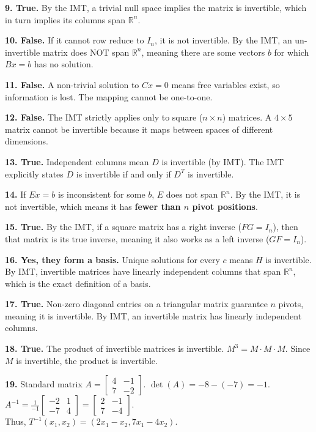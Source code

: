 \documentclass[12pt]{article}
\begin{document}
\textbf{9. True.} By the IMT, a trivial null space implies the matrix is invertible, which in turn implies its columns span $\mathbb{R}^n$.

\textbf{10. False.} If it cannot row reduce to $I_n$, it is not invertible. By the IMT, an un-invertible matrix does NOT span $\mathbb{R}^n$, meaning there are some vectors $b$ for which $Bx=b$ has no solution.

\textbf{11. False.} A non-trivial solution to $Cx = 0$ means free variables exist, so information is lost. The mapping cannot be one-to-one.

\textbf{12. False.} The IMT strictly applies only to square ($n \times n$) matrices. A $4 \times 5$ matrix cannot be invertible because it maps between spaces of different dimensions.

\textbf{13. True.} Independent columns mean $D$ is invertible (by IMT). The IMT explicitly states $D$ is invertible if and only if $D^T$ is invertible.

\textbf{14.} If $Ex = b$ is inconsistent for some $b$, $E$ does not span $\mathbb{R}^n$. By the IMT, it is not invertible, which means it has \textbf{fewer than $n$ pivot positions}.

\textbf{15. True.} By the IMT, if a square matrix has a right inverse ($FG = I_n$), then that matrix is its true inverse, meaning it also works as a left inverse ($GF = I_n$).

\textbf{16. Yes, they form a basis.} Unique solutions for every $c$ means $H$ is invertible. By IMT, invertible matrices have linearly independent columns that span $\mathbb{R}^n$, which is the exact definition of a basis.

\textbf{17. True.} Non-zero diagonal entries on a triangular matrix guarantee $n$ pivots, meaning it is invertible. By IMT, an invertible matrix has linearly independent columns.

\textbf{18. True.} The product of invertible matrices is invertible. $M^3 = M \cdot M \cdot M$. Since $M$ is invertible, the product is invertible.

\textbf{19.} Standard matrix $A = \begin{bmatrix} 4 & -1 \\ 7 & -2 \end{bmatrix}$. $\det(A) = -8 - (-7) = -1$. $A^{-1} = \frac{1}{-1} \begin{bmatrix} -2 & 1 \\ -7 & 4 \end{bmatrix} = \begin{bmatrix} 2 & -1 \\ 7 & -4 \end{bmatrix}$. \\
Thus, $T^{-1}(x_1, x_2) = (2x_1 - x_2, 7x_1 - 4x_2)$.
\end{document}
